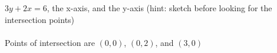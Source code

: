 {$3y+2x=6$, the x-axis, and the y-axis (hint: sketch before looking for the intersection points)}
{\text{}\\ \label{fig:02_04_ex_22} \\
Points of intersection are $(0,0)$, $(0,2)$, and $(3,0)$}
